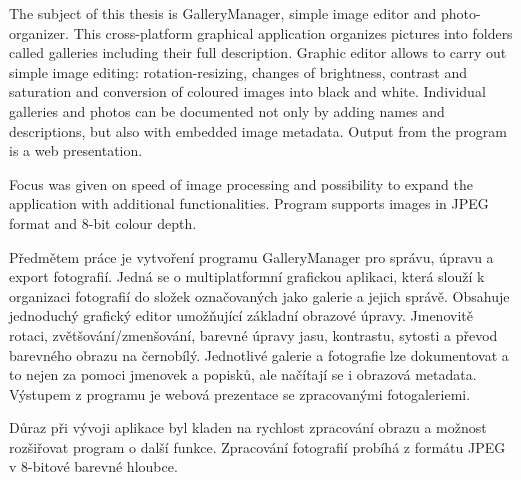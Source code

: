 \documentclass[11pt,twoside,a4paper]{book}
\begin{document}
\abstractpage
\noindent 
The subject of this thesis is GalleryManager, simple image editor and photo-organizer. This cross-platform graphical application organizes pictures into folders called galleries including their full description. Graphic editor allows to carry out simple image editing: rotation-resizing, changes of brightness, contrast and saturation and conversion of coloured images into black and white. Individual galleries and photos can be documented not only by adding names and descriptions, but also with embedded image metadata. Output from the program is a web presentation.

\indent
Focus was given on speed of image processing and possibility to expand the application with additional functionalities. Program supports images in JPEG format and 8-bit colour depth.

\baselineskip

\noindent 
Předmětem práce je vytvoření programu GalleryManager pro správu, úpravu a export fotografií. Jedná se o multiplatformní grafickou aplikaci, která slouží k organizaci fotografií do složek označovaných jako galerie a jejich správě. Obsahuje jednoduchý grafický editor umožňující základní obrazové úpravy. Jmenovitě rotaci, zvětšování/zmenšování, barevné úpravy jasu, kontrastu, sytosti a převod barevného obrazu na černobílý. Jednotlivé galerie a fotografie lze dokumentovat a to nejen za pomoci jmenovek a popisků, ale načítají se i obrazová metadata. Výstupem z programu je webová prezentace se zpracovanými fotogaleriemi.

\indent
Důraz při vývoji aplikace byl kladen na rychlost zpracování obrazu a možnost rozšiřovat program o další funkce. Zpracování fotografií probíhá z formátu JPEG v 8-bitové barevné hloubce.




\tableofcontents


\listoffigures


\listoftables

\end{document}
